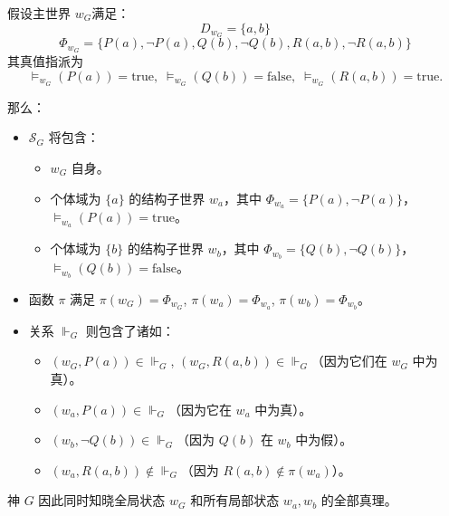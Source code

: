 \begin{example}
    假设主世界 \( w_G \)满足：
    \begin{equation} D_{w_G} = \{a, b\} \end{equation}
    \begin{equation} \Phi_{w_G} = \{P(a), \neg P(a), Q(b), \neg Q(b), R(a,b), \neg R(a,b)\} \end{equation}
    其真值指派为
    \begin{equation}
        \models_{w_G}(P(a)) = \text{true},\; \models_{w_G}(Q(b)) = \text{false},\; \models_{w_G}(R(a,b)) = \text{true}.
    \end{equation}

    那么：
    \begin{itemize}
        \item \( \mathcal{S}_G \) 将包含：
              \begin{itemize}
                  \item \( w_G \) 自身。
                  \item 个体域为 \( \{a\} \) 的结构子世界 \( w_a \)，其中 \( \Phi_{w_a} = \{P(a), \neg P(a)\} \)，\( \models_{w_a}(P(a)) = \text{true} \)。
                  \item 个体域为 \( \{b\} \) 的结构子世界 \( w_b \)，其中 \( \Phi_{w_b} = \{Q(b), \neg Q(b)\} \)，\( \models_{w_b}(Q(b)) = \text{false} \)。
              \end{itemize}
        \item 函数 \( \pi \) 满足 \( \pi(w_G) = \Phi_{w_G} \), \( \pi(w_a) = \Phi_{w_a} \), \( \pi(w_b) = \Phi_{w_b} \)。
        \item 关系 \( \Vdash_G \) 则包含了诸如：
              \begin{itemize}
                  \item \( (w_G, P(a)) \in \Vdash_G \), \( (w_G, R(a,b)) \in \Vdash_G \)（因为它们在 \( w_G \) 中为真）。
                  \item \( (w_a, P(a)) \in \Vdash_G \)（因为它在 \( w_a \) 中为真）。
                  \item \( (w_b, \neg Q(b)) \in \Vdash_G \)（因为 \( Q(b) \) 在 \( w_b \) 中为假）。
                  \item \( (w_a, R(a,b)) \notin \Vdash_G \)（因为 \( R(a,b) \notin \pi(w_a) \)）。
              \end{itemize}
    \end{itemize}
    神 \( G \) 因此同时知晓全局状态 \( w_G \) 和所有局部状态 \( w_a, w_b \) 的全部真理。
\end{example}

